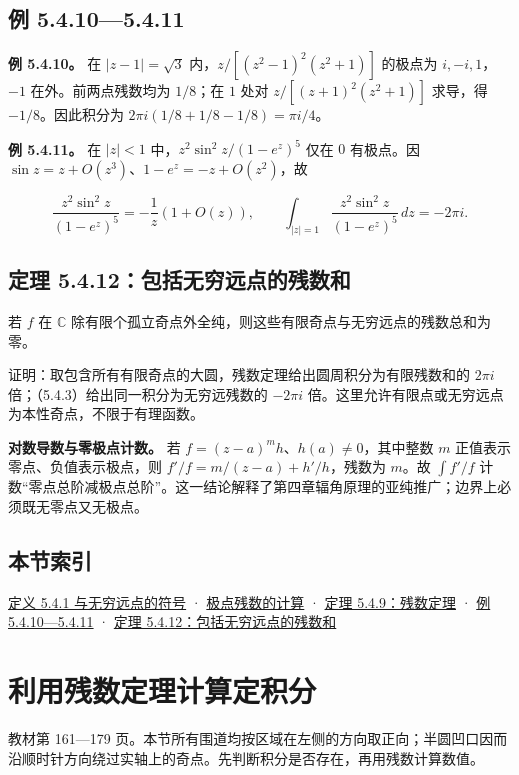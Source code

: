 \documentclass[11pt,a4paper]{article}
\begin{document}
\subsection{例 5.4.10---5.4.11}\label{ch05-s4-heading-4}

\textbf{例 5.4.10。} 在 \(|z-1|=\sqrt3\) 内，\(z/[(z^2-1)^2(z^2+1)]\)
的极点为 \(i,-i,1\)，\(-1\) 在外。前两点残数均为 \(1/8\)；在 \(1\) 处对
\(z/[(z+1)^2(z^2+1)]\) 求导，得 \(-1/8\)。因此积分为
\(2\pi i(1/8+1/8-1/8)=\pi i/4\)。

\textbf{例 5.4.11。} 在 \(|z|<1\) 中，\(z^2\sin^2z/(1-e^z)^5\) 仅在
\(0\) 有极点。因 \(\sin z=z+O(z^3)\)、\(1-e^z=-z+O(z^2)\)，故

\[
\frac{z^2\sin^2z}{(1-e^z)^5}=-\frac1z(1+O(z)),
\qquad \int_{|z|=1}\frac{z^2\sin^2z}{(1-e^z)^5}\,dz=-2\pi i.
\]

\subsection{定理 5.4.12：包括无穷远点的残数和}\label{ch05-s4-heading-5}

若 \(f\) 在 \(\mathbb C\)
除有限个孤立奇点外全纯，则这些有限奇点与无穷远点的残数总和为零。

证明：取包含所有有限奇点的大圆，残数定理给出圆周积分为有限残数和的
\(2\pi i\) 倍；（5.4.3）给出同一积分为无穷远残数的 \(-2\pi i\)
倍。这里允许有限点或无穷远点为本性奇点，不限于有理函数。

\textbf{对数导数与零极点计数。} 若
\(f=(z-a)^m h\)、\(h(a)\ne0\)，其中整数 \(m\)
正值表示零点、负值表示极点，则 \(f'/f=m/(z-a)+h'/h\)，残数为 \(m\)。故
\(\int f'/f\)
计数``零点总阶减极点总阶''。这一结论解释了第四章辐角原理的亚纯推广；边界上必须既无零点又无极点。

\subsection{本节索引}\label{ch05-s4-heading-6}

\hyperref[ch05-s4-heading-1]{定义 5.4.1 与无穷远点的符号} ·
\hyperref[ch05-s4-heading-2]{极点残数的计算} · \hyperref[ch05-s4-heading-3]{定理
5.4.9：残数定理} · \hyperref[ch05-s4-heading-4]{例 5.4.10---5.4.11} ·
\hyperref[ch05-s4-heading-5]{定理 5.4.12：包括无穷远点的残数和}

\section{利用残数定理计算定积分}
教材第 161---179
页。本节所有围道均按区域在左侧的方向取正向；半圆凹口因而沿顺时针方向绕过实轴上的奇点。先判断积分是否存在，再用残数计算数值。
\end{document}
